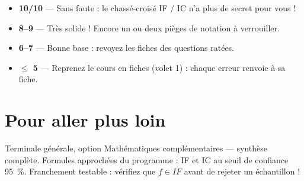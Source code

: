 \documentclass[11pt,a4paper]{article}
\newcommand{\IF}{\textit{IF}}
\begin{document}
	\begin{tcolorbox}[colback=spBlue!5, colframe=spBlueDark!75, boxrule=0.8pt,
		arc=2mm, left=3mm, right=3mm, top=2mm, bottom=2mm,
		title={\sffamily\bfseries Barème de commentaires}, coltitle=white,
		colbacktitle=spBlueDark, fonttitle=\bfseries]
		\begin{itemize}
			\item \textbf{10/10} — Sans faute : le chassé-croisé IF / IC n'a plus de
			secret pour vous !
			\item \textbf{8--9} — Très solide ! Encore un ou deux pièges de notation à
			verrouiller.
			\item \textbf{6--7} — Bonne base : revoyez les fiches des questions ratées.
			\item \textbf{$\leq$ 5} — Reprenez le cours en fiches (volet 1) : chaque
			erreur renvoie à sa fiche.
		\end{itemize}
	\end{tcolorbox}
	
	\section*{Pour aller plus loin}
	
	Terminale générale, option Mathématiques complémentaires — synthèse complète.
	Formules approchées du programme : IF et IC au seuil de confiance 95~\%.
	Franchement testable : vérifiez que $f \in \IF{}$ avant de rejeter un
	échantillon !
	
\end{document}
